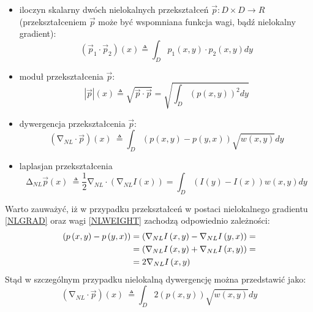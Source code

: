 \documentclass[12pt, twoside, openany]{report}
\theoremstyle{definition}
\begin{document}
\begin{itemize}
\item
iloczyn skalarny dwóch nielokalnych przekształceń $\overrightarrow{p}:D \times D \longrightarrow R$ (przekształceniem $\overrightarrow{p}$ może być wspomniana funkcja wagi, bądź nielokalny gradient):
\begin{equation}
\left({\overrightarrow{p}}_1\cdot {\overrightarrow{p}}_2\right)(x)\triangleq \int_D{p_1(x,y)\cdot p_2\left(x,y\right)dy}
\label{NLPRODUCT}
\end{equation}
\item
moduł przekształcenia $\overrightarrow{p}$:
\begin{equation}
\left|\overrightarrow{p}\right|\left(x\right)\triangleq \sqrt{\overrightarrow{p}\cdot \overrightarrow{p}}=\sqrt{\int_D{{\left(p\left(x,y\right)\right)}^2dy}} 
\label{NLMOD}
\end{equation}
\item
dywergencja przekształcenia $\overrightarrow{p}$:
\begin{equation}
({\mathrm{\nabla }}_{NL}\cdot \overrightarrow{p})(x)\ \triangleq \int_D{\left(p\left(x,y\right)-p\left(y,x\right)\right)\sqrt{w(x,y)}dy}
\label{NLDIV}
\end{equation}
\item
laplasjan przekształcenia
\begin{equation}
{\mathrm{\Delta }}_{NL}\overrightarrow{p}(x)\ \triangleq \frac{1}{2}{\mathrm{\nabla }}_{NL}\cdot \left({\mathrm{\nabla }}_{NL}I\left(x\right)\right)=\int_D{\left(I\left(y\right)-I\left(x\right)\right)w(x,y)dy}
\label{NLLAP}
\end{equation}
\end{itemize}
Warto zauważyć, iż w przypadku przekształceń w postaci nielokalnego gradientu \eqref{NLGRAD} oraz wagi \eqref{NLWEIGHT} zachodzą odpowiednio zależności:
\begin{align}
\left(p\left(x,y\right)-p\left(y,x\right)\right) &= \left({\mathrm{\nabla }}_{NL}I\left(x,y\right)-{\mathrm{\nabla }}_{NL}I\left(y,x\right)\right)  \notag =\\ 
&= \left({\mathrm{\nabla }}_{NL}I\left(x,y\right)+{\mathrm{\nabla }}_{NL}I\left(x,y\right)\right) \notag =\\
&=2{\mathrm{\nabla }}_{NL}I\left(x,y\right)\
\label{NLPOM}
\end{align}
Stąd w szczególnym przypadku nielokalną dywergencję można przedstawić jako: 
\begin{equation}
({\mathrm{\nabla }}_{NL}\cdot \overrightarrow{p})(x)\ \triangleq \int_D{2\left(p\left(x,y\right)\right)\sqrt{w(x,y)}dy}
\label{NLDIVSMART}
\end{equation}
\end{document}
